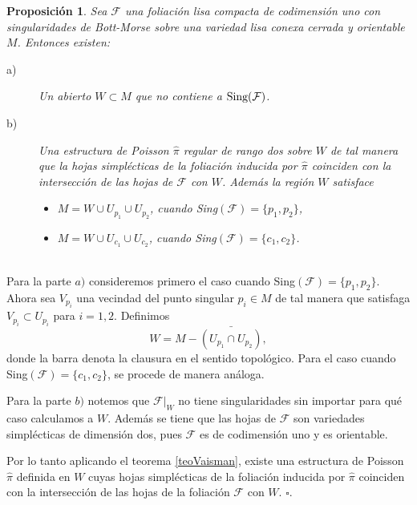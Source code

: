 \documentclass[a4paper,10pt]{book}
\newtheorem{propo}{Proposici\'on}[chapter]
\begin{document}
\begin{propo}\label{propofinal}
Sea $\mathcal{F}$ una foliaci\'on lisa compacta de codimensi\'on uno con singularidades de Bott-Morse sobre una variedad lisa conexa cerrada y orientable $M$. Entonces existen: 
\begin{description}
    \item[a)] Un abierto $W\subset M$ que no contiene a ${\rm Sing(\mathcal{F})}$. 
    \item[b)] Una estructura de Poisson $\hat{\pi}$ regular de rango dos sobre $W$ de tal manera que la hojas simpl\'ecticas de la foliaci\'on inducida por $\hat{\pi}$ coinciden con la intersecci\'on de las hojas de $\mathcal{F}$ con $W$. Adem\'as la regi\'on $W$ satisface 
    \begin{itemize}
        \item $M = W\cup U_{p_{1}}\cup U_{p_{2}}$, cuando {\rm Sing$(\mathcal{F})$}$=\{p_{1},p_{2}\}$, 
        \item $M = W\cup U_{c_{1}}\cup U_{c_{2}}$, cuando {\rm Sing$(\mathcal{F})$}$=\{c_{1},c_{2}\}$.
    \end{itemize}
\end{description}
\end{propo}
\\
Para la parte $a)$ consideremos primero el caso cuando {\rm Sing$(\mathcal{F})$}$=\{p_{1},p_{2}\}$. Ahora sea $V_{p_{i}}$ una vecindad del punto singular $p_{i}\in M$ de tal manera que satisfaga $V_{p_{i}}\subset U_{p_{i}}$ para $i=1,2$. Definimos 
$$W=M-\bar{(U_{p_{1}}\cap U_{p_{2}})},$$
donde la barra denota la clausura en el sentido topol\'ogico. Para el caso cuando {\rm Sing$(\mathcal{F})$}$=\{c_{1},c_{2}\}$, se procede de manera an\'aloga.
\vspace{5mm}

Para la parte $b)$ notemos que $\mathcal{F}|_{W}$ no tiene singularidades sin importar para qu\'e caso calculamos a $W$. Adem\'as se tiene que las hojas de $\mathcal{F}$ son variedades simpl\'ecticas de dimensi\'on dos, pues $\mathcal{F}$ es de codimensi\'on uno y es orientable. 
\vspace{5mm}

Por lo tanto aplicando el teorema \ref{teoVaisman}, existe una estructura de Poisson $\hat{\pi}$ definida en $W$ cuyas hojas simpl\'ecticas de la foliaci\'on inducida por $\hat{\pi}$ coinciden con la intersecci\'on de las hojas de la foliaci\'on $\mathcal{F}$ con $W$. \hfill $\square$.
\vspace{5mm}
\end{document}
